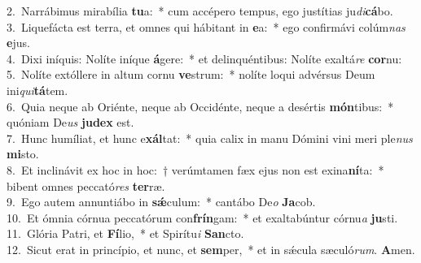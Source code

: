 {2.~}Narrábimus mirabília \textbf{tu}a:~* cum accépero tempus, ego justítias ju\textit{di}\textbf{cá}bo.\\
{3.~}Liquefácta est terra, et omnes qui hábitant in \textbf{e}a:~* ego confirmávi colúm\textit{nas} \textbf{e}jus.\\
{4.~}Dixi iníquis: Nolíte iníque \textbf{á}gere:~* et delinquéntibus: Nolíte exaltá\textit{re} \textbf{cor}nu:\\
{5.~}Nolíte extóllere in altum cornu \textbf{ve}strum:~* nolíte loqui advérsus Deum ini\textit{qui}\textbf{tá}tem.\\
{6.~}Quia neque ab Oriénte, neque ab Occidénte, neque a desértis \textbf{món}tibus:~* quóniam De\textit{us} \textbf{ju}\textbf{dex} est.\\
{7.~}Hunc humíliat, et hunc e\textbf{xál}tat:~* quia calix in manu Dómini vini meri ple\textit{nus} \textbf{mi}sto.\\
{8.~}Et inclinávit ex hoc in hoc:~† verúmtamen fæx ejus non est exina\textbf{ní}ta:~* bibent omnes peccató\textit{res} \textbf{ter}ræ.\\
{9.~}Ego autem annuntiábo in \textbf{sǽ}culum:~* cantábo De\textit{o} \textbf{Ja}cob.\\
{10.~}Et ómnia córnua peccatórum con\textbf{frín}gam:~* et exaltabúntur córnu\textit{a} \textbf{ju}sti.\\
{11.~}Glória Patri, et \textbf{Fí}lio,~* et Spirítu\textit{i} \textbf{San}cto.\\
{12.~}Sicut erat in princípio, et nunc, et \textbf{sem}per,~* et in sǽcula sæculó\textit{rum}. \textbf{A}men.\\
